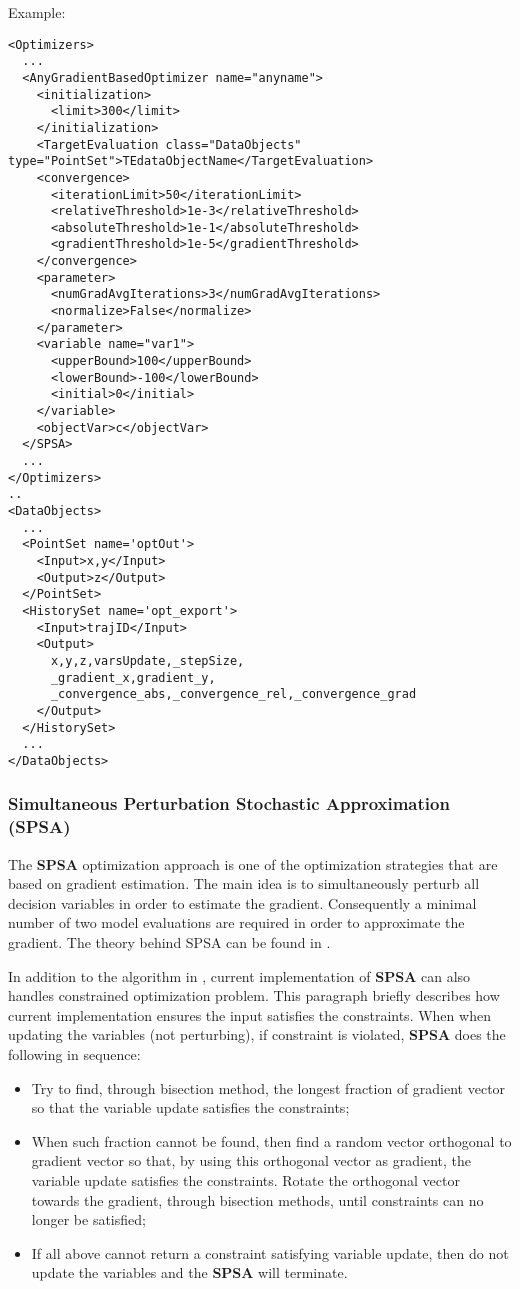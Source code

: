 Example:
\begin{lstlisting}[style=XML]
<Optimizers>
  ...
  <AnyGradientBasedOptimizer name="anyname">
    <initialization>
      <limit>300</limit>
    </initialization>
    <TargetEvaluation class="DataObjects" type="PointSet">TEdataObjectName</TargetEvaluation>
    <convergence>
      <iterationLimit>50</iterationLimit>
      <relativeThreshold>1e-3</relativeThreshold>
      <absoluteThreshold>1e-1</absoluteThreshold>
      <gradientThreshold>1e-5</gradientThreshold>
    </convergence>
    <parameter>
      <numGradAvgIterations>3</numGradAvgIterations>
      <normalize>False</normalize>
    </parameter>
    <variable name="var1">
      <upperBound>100</upperBound>
      <lowerBound>-100</lowerBound>
      <initial>0</initial>
    </variable>
    <objectVar>c</objectVar>
  </SPSA>
  ...
</Optimizers>
..
<DataObjects>
  ...
  <PointSet name='optOut'>
    <Input>x,y</Input>
    <Output>z</Output>
  </PointSet>
  <HistorySet name='opt_export'>
    <Input>trajID</Input>
    <Output>
      x,y,z,varsUpdate,_stepSize,
      _gradient_x,gradient_y,
      _convergence_abs,_convergence_rel,_convergence_grad
    </Output>
  </HistorySet>
  ...
</DataObjects>
\end{lstlisting}

\subsubsection{Simultaneous Perturbation Stochastic Approximation (SPSA)}
\label{subsubsubsec:SPSA}
The \textbf{SPSA} optimization approach is one of the optimization strategies that are based on gradient estimation. The main
idea is to simultaneously perturb all decision variables in order to estimate the gradient. Consequently a minimal number of two
model evaluations are required in order to approximate the gradient. The theory behind SPSA can be found in
\cite{spall1998implementation}.

In addition to the algorithm in \cite{spall1998implementation}, current implementation of \textbf{SPSA} can also handles
constrained optimization problem. This paragraph briefly describes how current implementation ensures the input satisfies the
constraints. When when updating the variables (not perturbing), if constraint is violated, \textbf{SPSA} does the following in
sequence:
\begin{itemize}
\item Try to find, through bisection method, the longest fraction of gradient vector so that the variable update satisfies the
constraints;
\item When such fraction cannot be found, then find a random vector orthogonal to gradient vector so that, by using this
orthogonal vector as gradient, the variable update satisfies the constraints. Rotate the orthogonal vector towards the gradient,
through bisection methods, until constraints can no longer be satisfied;
\item If all above cannot return a constraint satisfying variable update, then do not update the variables and the \textbf{SPSA} will
terminate.
\end{itemize}

